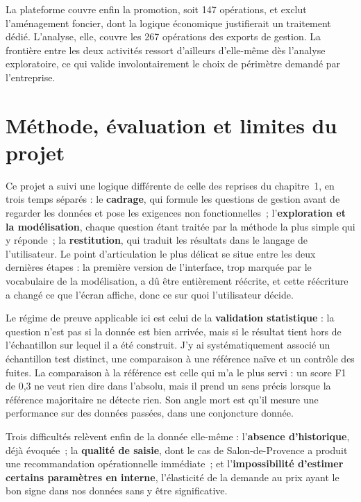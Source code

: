La plateforme couvre enfin la promotion, soit 147 opérations, et exclut l'aménagement foncier,
dont la logique économique justifierait un traitement dédié. L'analyse, elle, couvre les 267
opérations des exports de gestion. La frontière entre les deux activités ressort d'ailleurs
d'elle-même dès l'analyse exploratoire, ce qui valide involontairement le choix de périmètre
demandé par l'entreprise.

\hypertarget{muxe9thode-uxe9valuation-et-limites-du-projet}{%
\section{Méthode, évaluation et limites du projet}\label{muxe9thode-uxe9valuation-et-limites-du-projet}}

Ce projet a suivi une logique différente de celle des reprises du chapitre~1, en trois temps
séparés : le \textbf{cadrage}, qui formule les questions de gestion avant de regarder les données et
pose les exigences non fonctionnelles~; l'\textbf{exploration et la modélisation}, chaque question
étant traitée par la méthode la plus simple qui y réponde~; la \textbf{restitution}, qui traduit les
résultats dans le langage de l'utilisateur. Le point d'articulation le plus délicat se situe
entre les deux dernières étapes : la première version de l'interface, trop marquée par le
vocabulaire de la modélisation, a dû être entièrement réécrite, et cette réécriture a changé ce
que l'écran affiche, donc ce sur quoi l'utilisateur décide.

Le régime de preuve applicable ici est celui de la \textbf{validation statistique} : la question
n'est pas si la donnée est bien arrivée, mais si le résultat tient hors de l'échantillon sur
lequel il a été construit. J'y ai systématiquement associé un échantillon test distinct, une
comparaison à une référence naïve et un contrôle des fuites. La comparaison à la référence est
celle qui m'a le plus servi : un score F1 de 0,3 ne veut rien dire dans l'absolu, mais il prend
un sens précis lorsque la référence majoritaire ne détecte rien. Son angle mort est qu'il
mesure une performance sur des données passées, dans une conjoncture donnée.

Trois difficultés relèvent enfin de la donnée elle-même : l'\textbf{absence d'historique}, déjà
évoquée~; la \textbf{qualité de saisie}, dont le cas de Salon-de-Provence a produit une
recommandation opérationnelle immédiate~; et l'\textbf{impossibilité d'estimer certains paramètres en
interne}, l'élasticité de la demande au prix ayant le bon signe dans nos données sans y être
significative.

